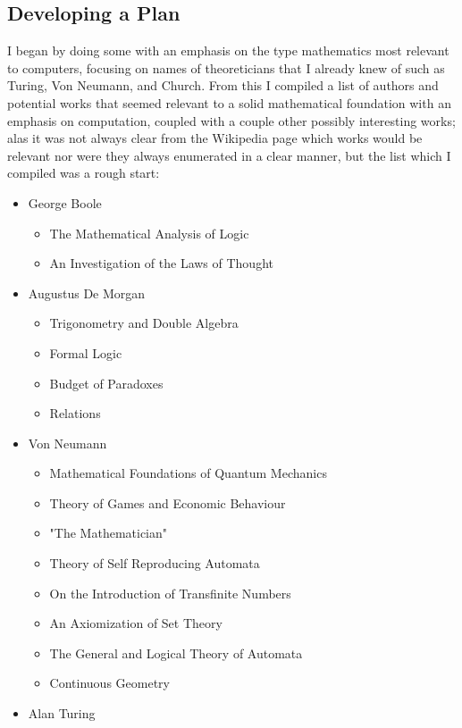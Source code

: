 \documentclass{article}
\begin{document}
\subsection{Developing a Plan}
I began by doing some  with an emphasis on the type mathematics most relevant to computers, focusing on names of theoreticians that I already knew of such as Turing, Von Neumann, and Church.  From this I compiled a list of authors and potential works that seemed relevant to a solid mathematical foundation with an emphasis on computation, coupled with a couple other possibly interesting works; alas it was not always clear from the Wikipedia page which works would be relevant nor were they always enumerated in a clear manner, but the list which I compiled was a rough start:
\begin{itemize}
	\item George Boole
	\begin{itemize}
		\item The Mathematical Analysis of Logic
		\item An Investigation of the Laws of Thought
	\end{itemize}
	\item Augustus De Morgan
	\begin{itemize}
		\item Trigonometry and Double Algebra
		\item Formal Logic
		\item Budget of Paradoxes
		\item Relations
	\end{itemize}
	\item Von Neumann
	\begin{itemize}
		\item Mathematical Foundations of Quantum Mechanics
		\item Theory of Games and Economic Behaviour
		\item "The Mathematician"
		\item Theory of Self Reproducing Automata
		\item On the Introduction of Transfinite Numbers
		\item An Axiomization of Set Theory
		\item The General and Logical Theory of Automata
		\item Continuous Geometry
	\end{itemize}
	\item Alan Turing
	\begin{itemize}

\end{itemize}
\end{itemize}
\end{document}
